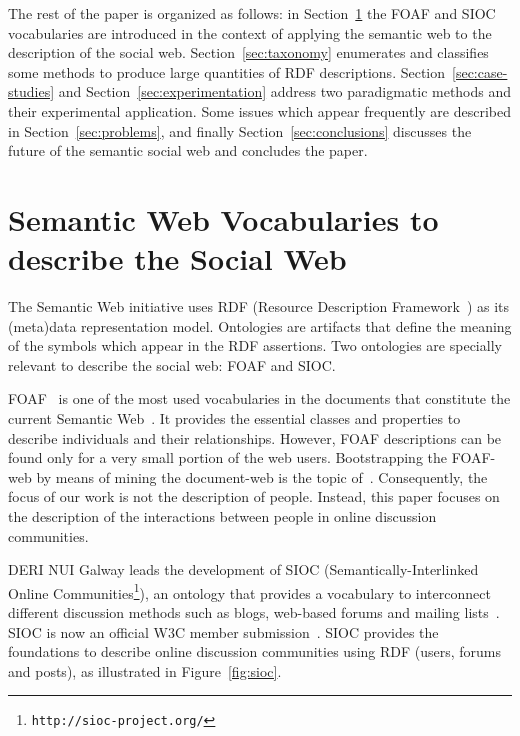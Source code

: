 \documentclass{../templates/www2008-submission}
\begin{document}
The rest of the paper is organized as follows: in Section~\ref{sec:vocabularies}
the FOAF and SIOC vocabularies are introduced in the context of applying
the semantic web to the description of the social web. Section~\ref{sec:taxonomy}
enumerates and classifies some methods to produce large quantities
of RDF descriptions. Section~\ref{sec:case-studies} and
Section~\ref{sec:experimentation} address two paradigmatic methods
and their experimental application. Some issues which appear
frequently are described in Section~\ref{sec:problems}, and
finally Section~\ref{sec:conclusions} discusses the future of the
semantic social web and concludes the paper.


\section{Semantic Web Vocabularies to describe the Social Web}\label{sec:vocabularies}

The Semantic Web initiative uses RDF (Resource Description
Framework~\cite{RDF}) as its (meta)data representation model.
Ontologies are artifacts that define the meaning of the symbols
which appear in the RDF assertions. Two ontologies are
specially relevant to describe the social web: FOAF and SIOC.

FOAF~\cite{FOAF} is one of the most used vocabularies in the documents that
constitute the current Semantic Web~\cite{Ding2005, Finin2005}.
It provides the essential classes and properties to describe individuals
and their relationships. However, FOAF descriptions can be found
only for a very small portion of the web users. Bootstrapping the
FOAF-web by means of mining the document-web is the topic
of~\cite{Mika2004}. Consequently, the focus of our work is not the
description of people. Instead, this paper focuses on the description
of the interactions between people in online discussion communities.

DERI NUI Galway leads the development of SIOC (Seman\-ti\-cally-Interlinked Online
Communities\footnote{\texttt{http://sioc-project.org/}}), an ontology that 
provides a vocabulary to interconnect different discussion methods such 
as blogs, web-based forums and mailing lists~\cite{Breslin2006,Breslin2005}.
SIOC is now an official W3C member submission~\cite{Bojars2007}.
SIOC provides the foundations to describe online discussion
communities using RDF (users, forums and posts), as illustrated in
Figure~\ref{fig:sioc}.
\end{document}
